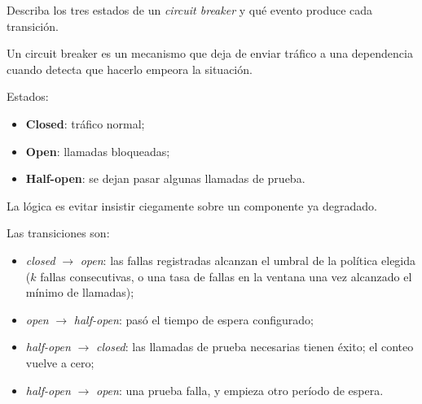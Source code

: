 \documentclass[variant=guia,cover=institutional,mode=screen]{ua-engineering-v6-article}
\begin{document}
\begin{uaexercise}
Describa los tres estados de un \emph{circuit breaker} y qué evento produce cada transición.
\end{uaexercise}
\begin{uaanswer}
Un circuit breaker es un mecanismo que deja de enviar tráfico a una dependencia cuando detecta que hacerlo empeora la situación.

Estados:
\begin{itemize}
\item \textbf{Closed}: tráfico normal;
\item \textbf{Open}: llamadas bloqueadas;
\item \textbf{Half-open}: se dejan pasar algunas llamadas de prueba.
\end{itemize}

La lógica es evitar insistir ciegamente sobre un componente ya degradado.

Las transiciones son:
\begin{itemize}
\item \emph{closed} $\to$ \emph{open}: las fallas registradas alcanzan el umbral de la política elegida ($k$ fallas consecutivas, o una tasa de fallas en la ventana una vez alcanzado el mínimo de llamadas);
\item \emph{open} $\to$ \emph{half-open}: pasó el tiempo de espera configurado;
\item \emph{half-open} $\to$ \emph{closed}: las llamadas de prueba necesarias tienen éxito; el conteo vuelve a cero;
\item \emph{half-open} $\to$ \emph{open}: una prueba falla, y empieza otro período de espera.
\end{itemize}
\end{uaanswer}
\end{document}
